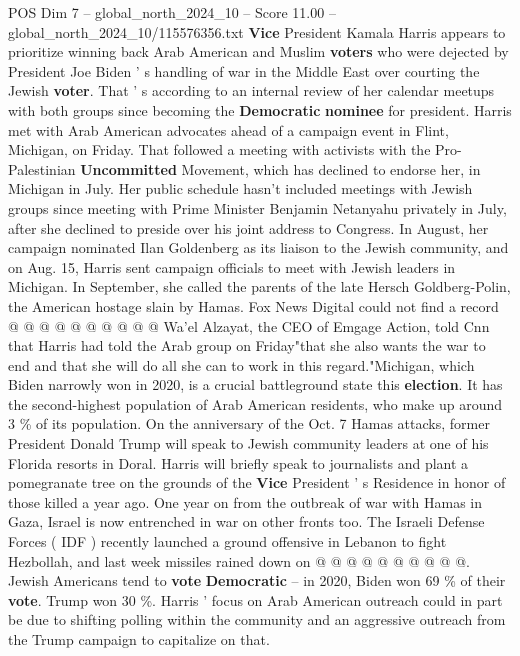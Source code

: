 \begin{textsample}{POS Dim 7 – global\_north\_2024\_10 – Score 11.00 – global\_north\_2024\_10/115576356.txt}  \label{ex:f7_pos_099}
\textbf{Vice} President Kamala Harris appears to prioritize winning back Arab American and Muslim \textbf{voters} who were dejected by President Joe Biden ' s handling of war in the Middle East over courting the Jewish \textbf{voter}.
That ' s according to an internal review of her calendar meetups with both groups since becoming the \textbf{Democratic} \textbf{nominee} for president.
Harris met with Arab American advocates ahead of a campaign event in Flint, Michigan, on Friday.
That followed a meeting with activists with the Pro-Palestinian \textbf{Uncommitted} Movement, which has declined to endorse her, in Michigan in July.
Her public schedule hasn't included meetings with Jewish groups since meeting with Prime Minister Benjamin Netanyahu privately in July, after she declined to preside over his joint address to Congress.
In August, her campaign nominated Ilan Goldenberg as its liaison to the Jewish community, and on Aug. 15, Harris sent campaign officials to meet with Jewish leaders in Michigan.
In September, she called the parents of the late Hersch Goldberg-Polin, the American hostage slain by Hamas.
Fox News Digital could not find a record @ @ @ @ @ @ @ @ @ @ Wa'el Alzayat, the CEO of Emgage Action, told Cnn that Harris had told the Arab group on Friday"that she also wants the war to end and that she will do all she can to work in this regard."Michigan, which Biden narrowly won in 2020, is a crucial battleground state this \textbf{election}.
It has the second-highest population of Arab American residents, who make up around 3 \% of its population.
On the anniversary of the Oct. 7 Hamas attacks, former President Donald Trump will speak to Jewish community leaders at one of his Florida resorts in Doral.
Harris will briefly speak to journalists and plant a pomegranate tree on the grounds of the \textbf{Vice} President ' s Residence in honor of those killed a year ago.
One year on from the outbreak of war with Hamas in Gaza, Israel is now entrenched in war on other fronts too.
The Israeli Defense Forces ( IDF ) recently launched a ground offensive in Lebanon to fight Hezbollah, and last week missiles rained down on @ @ @ @ @ @ @ @ @ @.
Jewish Americans tend to \textbf{vote} \textbf{Democratic} -- in 2020, Biden won 69 \% of their \textbf{vote}.
Trump won 30 \%.
Harris ' focus on Arab American outreach could in part be due to shifting polling within the community and an aggressive outreach from the Trump campaign to capitalize on that.

\end{textsample}
